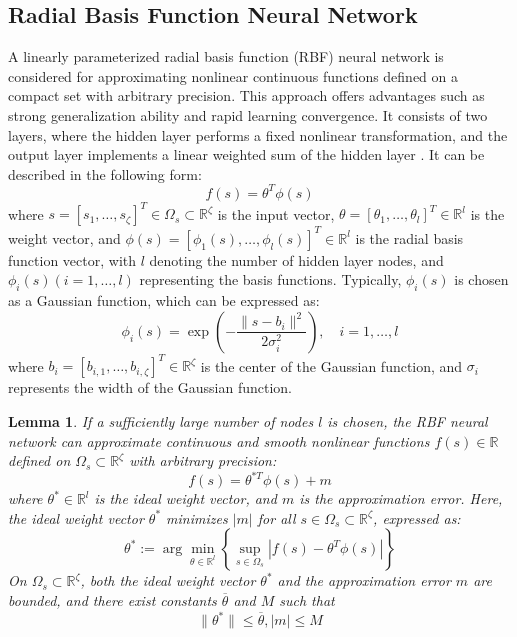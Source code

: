 \documentclass[preprint,12pt]{elsarticle}
\newtheorem{lemma}[theorem]{Lemma}
\begin{document}
\subsection{Radial Basis Function Neural Network}
A linearly parameterized radial basis function (RBF) neural network is considered for approximating nonlinear continuous functions defined on a compact set with arbitrary precision. This approach offers advantages such as strong generalization ability and rapid learning convergence. It consists of two layers, where the hidden layer performs a fixed nonlinear transformation, and the output layer implements a linear weighted sum of the hidden layer \cite{Du2015AdaptiveRO}. It can be described in the following form:
\begin{equation}
    f(s) = \theta^{T} \phi(s)
\end{equation}
where \(s =[s_1,\dots,s_{\zeta}]^T \in \Omega_s \subset \mathbb{R}^{\zeta}\) is the input vector, \(\theta=[\theta_1,\dots,\theta_l]^T \in \mathbb{R}^l\) is the weight vector, and \(\phi(s) = [\phi_1(s),\dots,\phi_l(s)]^T \in \mathbb{R}^l\) is the radial basis function vector, with $l$ denoting the number of hidden layer nodes, and $\phi_i(s)(i = 1,\dots ,l)$ representing the basis functions. Typically, $\phi_i(s)$ is chosen as a Gaussian function, which can be expressed as:
\begin{equation}
    \phi_i(s) = \exp\left(-\frac{\|s - b_i\|^2}{2\sigma_i^2}\right), \quad i = 1, \ldots, l \label{RBF}
\end{equation}
where \( b_i =  [b_{i,1},\dots,b_{i,{\zeta}}]^T \in \mathbb{R}^{\zeta}\) is the center of the Gaussian function, and \( \sigma_i \) represents the width of the Gaussian function.

\begin{lemma}
\cite{486648,6797088} If a sufficiently large number of nodes $l$ is chosen, the RBF neural network can approximate continuous and smooth nonlinear functions $f(s)\in \mathbb{R}$ defined on $\Omega_s \subset \mathbb{R}^{\zeta}$ with arbitrary precision:
\begin{equation}
    f(s) = \theta^{*T} \phi(s) + m
\end{equation}
where $\theta^{*}\in \mathbb{R}^l$ is the ideal weight vector, and $m$ is the approximation error. Here, the ideal weight vector $\theta^{*}$ minimizes $|m|$ for all $s \in \Omega_s \subset \mathbb{R}^{\zeta}$, expressed as:
\begin{equation}
    \theta^{*} := \arg \min_{\theta\in \mathbb{R}^l}\left\{ \sup_{s \in \Omega_s}| f(s) - \theta^T \phi(s)|\right\}
\end{equation}
On $\Omega_s \subset \mathbb{R}^{\zeta}$, both the ideal weight vector $\theta^{*}$ and the approximation error $m$ are bounded, and there exist constants $\overline{\theta}$ and $M$ such that
\[\|\theta^{*}\| \leq \overline{\theta} ,|m| \leq M\]
\end{lemma}
\end{document}

